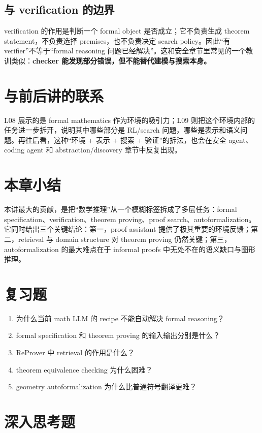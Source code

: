 \documentclass[a4paper]{article}
\begin{document}
\subsection{与 verification 的边界}

verification 的作用是判断一个 formal object 是否成立；它不负责生成 theorem statement，不负责选择 premises，也不负责决定 search policy。因此“有 verifier”不等于“formal reasoning 问题已经解决”。这和安全章节里常见的一个教训类似：\textbf{checker 能发现部分错误，但不能替代建模与搜索本身。}

\section{与前后讲的联系}

L08 展示的是 formal mathematics 作为环境的吸引力；L09 则把这个环境内部的任务进一步拆开，说明其中哪些部分是 RL/search 问题，哪些是表示和语义问题。再往后看，这种“环境 + 表示 + 搜索 + 验证”的拆法，也会在安全 agent、coding agent 和 abstraction/discovery 章节中反复出现。

\section{本章小结}

本讲最大的贡献，是把“数学推理”从一个模糊标签拆成了多层任务：formal specification、verification、theorem proving、proof search、autoformalization。它同时给出三个关键结论：第一，proof assistant 提供了极其重要的环境反馈；第二，retrieval 与 domain structure 对 theorem proving 仍然关键；第三，autoformalization 的最大难点在于 informal proofs 中无处不在的语义缺口与图形推理。

\section{复习题}

\begin{enumerate}
\item 为什么当前 math LLM 的 recipe 不能自动解决 formal reasoning？
\item formal specification 和 theorem proving 的输入输出分别是什么？
\item ReProver 中 retrieval 的作用是什么？
\item theorem equivalence checking 为什么困难？
\item geometry autoformalization 为什么比普通符号翻译更难？
\end{enumerate}

\section{深入思考题}
\end{document}
